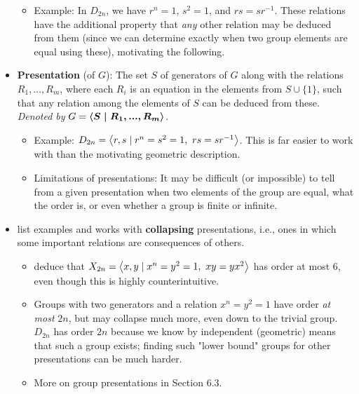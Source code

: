 \documentclass[../notes.tex]{subfiles}
\begin{document}
\begin{itemize}
    \begin{itemize}
        \item Example: In $D_{2n}$, we have $r^n=1$, $s^2=1$, and $rs=sr^{-1}$. These relations have the additional property that \emph{any} other relation may be deduced from them (since we can determine exactly when two group elements are equal using these), motivating the following.
    \end{itemize}
    \item \textbf{Presentation} (of $G$): The set $S$ of generators of $G$ along with the relations $R_1,\dots,R_m$, where each $R_i$ is an equation in the elements from $S\cup\{1\}$, such that any relation among the elements of $S$ can be deduced from these. \emph{Denoted by} $G=\bm{\left\langle{S\mid R_1,...,R_m}\right\rangle}$.
    \begin{itemize}
        \item Example: $D_{2n}=\left\langle{r,s\mid r^n=s^2=1,\ rs=sr^{-1}}\right\rangle$. This is far easier to work with than the motivating geometric description.
        \item Limitations of presentations: It may be difficult (or impossible) to tell from a given presentation when two elements of the group are equal, what the order is, or even whether a group is finite or infinite.
    \end{itemize}
    \item \textcite{bib:DummitFoote} list examples and works with \textbf{collapsing} presentations, i.e., ones in which some important relations are consequences of others.
    \begin{itemize}
        \item \textcite{bib:DummitFoote} deduce that $X_{2n}=\gen{x,y\mid x^n=y^2=1,\ xy=yx^2}$ has order at most 6, even though this is highly counterintuitive.
        \item Groups with two generators and a relation $x^n=y^2=1$ have order \emph{at most} $2n$, but may collapse much more, even down to the trivial group. $D_{2n}$ has order $2n$ because we know by independent (geometric) means that such a group exists; finding such "lower bound" groups for other presentations can be much harder.
        \item More on group presentations in Section 6.3.
    \end{itemize}
\end{itemize}
\end{document}
